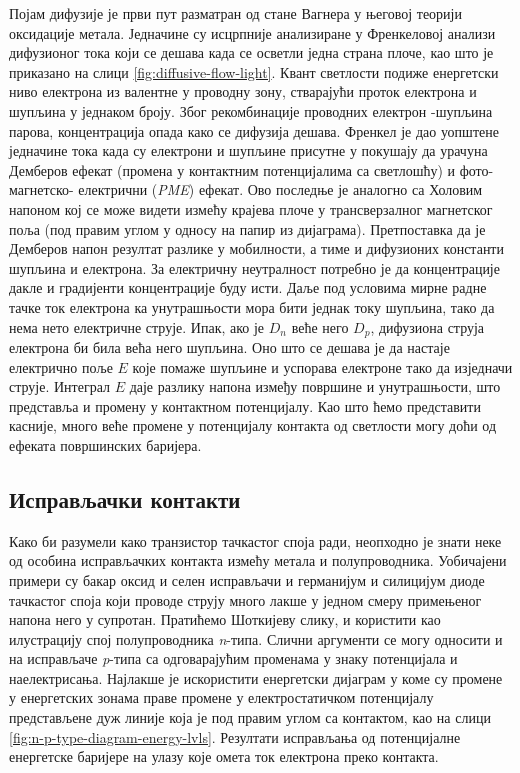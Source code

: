 \documentclass{article}
\begin{document}
Појам дифузије је први пут разматран од стане Вагнера у његовој теорији оксидације метала. Једначине су исцрпније анализиране у Френкеловој анализи дифузионог тока који се дешава када се осветли једна страна плоче, као што је приказано на слици \ref{fig:diffusive-flow-light}. Квант светлости подиже енергетски ниво електрона из валентне у проводну зону, стварајући проток електрона и шупљина у једнаком броју. Због рекомбинације проводних електрон -шупљина парова, концентрација опада како се дифузија дешава. Френкел је дао уопштене једначине тока када су електрони и шупљине присутне у покушају да урачуна Демберов ефекат (промена у контактним потенцијалима са светлошћу) и фото- магнетско- електрични (\textit{PME}) ефекат. Ово последње је аналогно са Холовим напоном кој се може видети измећу крајева плоче у трансверзалног магнетског поља (под правим углом у односу на папир из дијаграма). Претпоставка да је Демберов напон резултат разлике у мобилности, а тиме и дифузионих константи шупљина и електрона. За електричну неутралност потребно је да концентрације дакле и градијенти концентрације буду исти. Даље под условима мирне радне тачке ток електрона ка унутрашњости мора бити једнак току шупљина, тако да нема нето електричне струје. Ипак, ако је $D_n$ веће него $D_p$, дифузиона струја електрона би била већа него шупљина. Оно што се дешава је да настаје електрично поље $E$ које помаже шупљине и успорава електроне тако да изједначи струје. Интеграл $E$ даје разлику напона између површине и унутрашњости, што представља и промену у контактном потенцијалу. Као што ћемо представити касније, много веће промене у потенцијалу контакта од светлости могу доћи од ефеката површинских баријера.

\subsection{Исправљачки контакти}


Како би разумели како транзистор тачкастог споја ради, неопходно је знати неке од особина исправљачких контакта измећу метала и полупроводника. Уобичајени примери су бакар оксид и селен исправљачи и германијум и силицијум диоде тачкастог споја који проводе струју много лакше у једном смеру примењеног напона него у супротан. Пратићемо Шоткијеву слику, и користити као илустрацију спој полупроводника \textit{n}-типа. Слични аргументи се могу односити и на исправљаче \textit{p}-типа са одговарајућим променама у знаку потенцијала и наелектрисања. Најлакше је искористити енергетски дијаграм у коме су промене у енергетских зонама праве промене у електростатичком потенцијалу представљене дуж линије која је под правим углом са контактом, као на слици \ref{fig:n-p-type-diagram-energy-lvls}. Резултати исправљања од потенцијалне енергетске баријере на улазу које омета ток електрона преко контакта.
\end{document}
